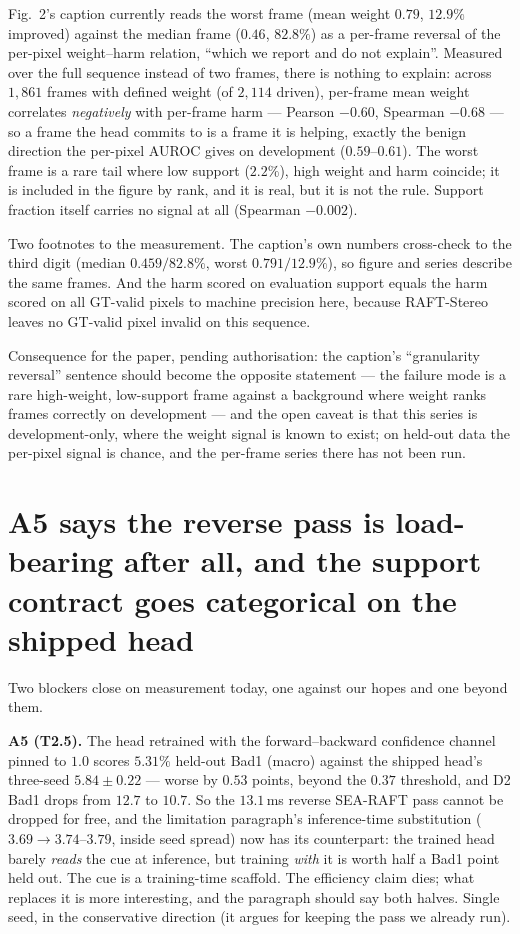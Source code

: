 \documentclass[11pt,a4paper]{article}
\begin{document}
Fig.~2's caption currently reads the worst frame (mean weight $0.79$, $12.9\%$
improved) against the median frame ($0.46$, $82.8\%$) as a per-frame reversal
of the per-pixel weight--harm relation, ``which we report and do not
explain''. Measured over the full sequence instead of two frames, there is
nothing to explain: across $1{,}861$ frames with defined weight (of $2{,}114$
driven), per-frame mean weight correlates \emph{negatively} with per-frame
harm --- Pearson $-0.60$, Spearman $-0.68$ --- so a frame the head commits to
is a frame it is helping, exactly the benign direction the per-pixel AUROC
gives on development ($0.59$--$0.61$). The worst frame is a rare tail where
low support ($2.2\%$), high weight and harm coincide; it is included in the
figure by rank, and it is real, but it is not the rule. Support fraction
itself carries no signal at all (Spearman $-0.002$).

Two footnotes to the measurement. The caption's own numbers cross-check to
the third digit (median $0.459/82.8\%$, worst $0.791/12.9\%$), so figure and
series describe the same frames. And the harm scored on evaluation support
equals the harm scored on all GT-valid pixels to machine precision here,
because RAFT-Stereo leaves no GT-valid pixel invalid on this sequence.

Consequence for the paper, pending authorisation: the caption's ``granularity
reversal'' sentence should become the opposite statement --- the failure mode
is a rare high-weight, low-support frame against a background where weight
ranks frames correctly on development --- and the open caveat is that this
series is development-only, where the weight signal is known to exist; on
held-out data the per-pixel signal is chance, and the per-frame series there
has not been run.



\section*{A5 says the reverse pass is load-bearing after all, and the support contract goes categorical on the shipped head}

Two blockers close on measurement today, one against our hopes and one beyond
them.

\textbf{A5 (T2.5).} The head retrained with the forward--backward confidence
channel pinned to $1.0$ scores $5.31\%$ held-out Bad1 (macro) against the
shipped head's three-seed $5.84 \pm 0.22$ --- worse by $0.53$ points, beyond
the $0.37$ threshold, and D2 Bad1 drops from $12.7$ to $10.7$. So the
$13.1$\,ms reverse SEA-RAFT pass cannot be dropped for free, and the
limitation paragraph's inference-time substitution ($3.69 \to 3.74$--$3.79$,
inside seed spread) now has its counterpart: the trained head barely
\emph{reads} the cue at inference, but training \emph{with} it is worth half a
Bad1 point held out. The cue is a training-time scaffold. The efficiency claim
dies; what replaces it is more interesting, and the paragraph should say both
halves. Single seed, in the conservative direction (it argues for keeping the
pass we already run).
\end{document}
